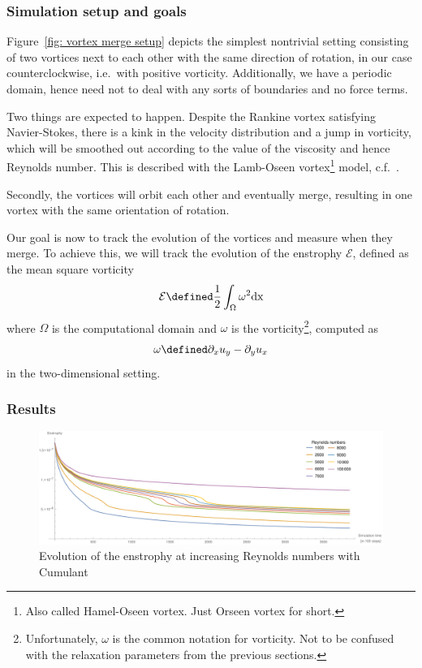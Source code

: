 \subsubsection{Simulation setup and goals}
\label{subs:Simulation setup and goals}

Figure~\ref{fig: vortex merge setup} depicts the simplest nontrivial setting consisting of two vortices next to each other with the same direction of rotation, in our case counterclockwise, i.e.\ with positive vorticity.
Additionally, we have a periodic domain, hence need not to deal with any sorts of boundaries and no force terms.

Two things are expected to happen.
Despite the Rankine vortex satisfying Navier-Stokes, there is a kink in the velocity distribution and a jump in vorticity, which will be smoothed out according to the value of the viscosity and hence Reynolds number.
This is described with the Lamb-Oseen vortex\footnote{Also called Hamel-Oseen vortex. Just Orseen vortex for short.} model, c.f.~\cite{tryggeson2007analytical}.

Secondly, the vortices will orbit each other and eventually merge, resulting in one vortex with the same orientation of rotation.

Our goal is now to track the evolution of the vortices and measure when they merge.
To achieve this, we will track the evolution of the enstrophy $\mathcal{E}$, defined as the mean square vorticity
\begin{equation*}
  \label{eq: enstrophy}
  \mathcal{E} \defined \frac{1}{2}\int_{\Omega} \omega^2 \text{dx}
\end{equation*}
where $\Omega$ is the computational domain and $\omega$ is the vorticity\footnote{Unfortunately, $\omega$ is the common notation for vorticity. Not to be confused with the relaxation parameters from the previous sections.}, computed as
\begin{equation*}
  \label{eq: vorticity}
  \omega \defined \partial_x u_y - \partial_y u_x
\end{equation*}
in the two-dimensional setting.

\subsubsection{Results}
\label{subs:Results}

\begin{figure}
  \centering
  \includegraphics[width=\textwidth]{../figures/vortexMerge_enstrophy_cumulants.pdf}  %
  \caption{Evolution of the enstrophy at increasing Reynolds numbers with Cumulant}
\label{fig: rankine cumulant all}
\end{figure}

